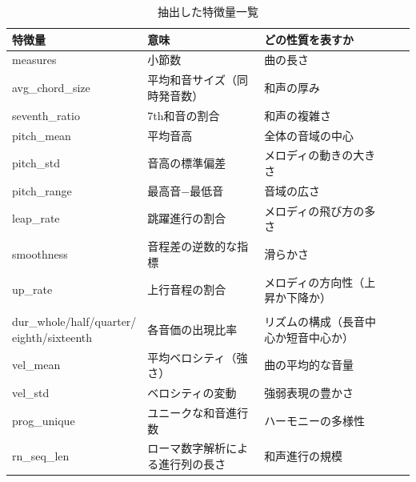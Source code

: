\begin{table}[t]
    \caption{抽出した特徴量一覧}    \label{tab:features}
    \centering
        \begin{tabular}{lllll}\hline
            特徴量              & 意味               & どの性質を表すか         &  & \\\hline\hline
            measures         & 小節数              & 曲の長さ             &  & \\
            avg\_chord\_size & 平均和音サイズ（同時発音数）   & 和声の厚み            &  & \\
            seventh\_ratio   & 7th和音の割合         & 和声の複雑さ           &  & \\
            pitch\_mean      & 平均音高             & 全体の音域の中心         &  & \\
            pitch\_std       & 音高の標準偏差          & メロディの動きの大きさ      &  & \\
            pitch\_range     & 最高音−最低音          & 音域の広さ            &  & \\
            leap\_rate       & 跳躍進行の割合          & メロディの飛び方の多さ      &  & \\
            smoothness       & 音程差の逆数的な指標       & 滑らかさ             &  & \\
            up\_rate         & 上行音程の割合          & メロディの方向性（上昇か下降か） &  & \\
            \\
            \shortstack{dur\_whole/half/quarter/                        \\eighth/sixteenth} & 各音価の出現比率         & リズムの構成（長音中心か短音中心か） &  &  \\
            vel\_mean        & 平均ベロシティ（強さ）      & 曲の平均的な音量         &  & \\
            vel\_std         & ベロシティの変動         & 強弱表現の豊かさ         &  & \\
            prog\_unique     & ユニークな和音進行数       & ハーモニーの多様性        &  & \\
            rn\_seq\_len     & ローマ数字解析による進行列の長さ & 和声進行の規模          &  & \\\hline
        \end{tabular}
\end{table}